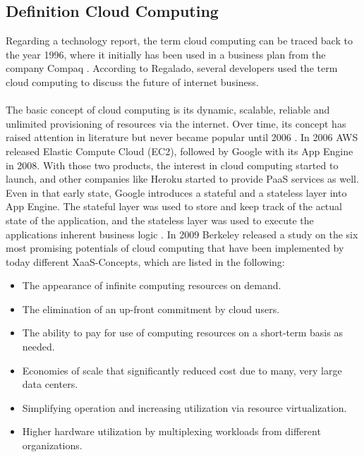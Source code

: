 \documentclass[a4paper,twoside,11pt, pagesize]{scrartcl}
\begin{document}
\begin{spacing}{1.2}
\subsection{Definition Cloud Computing}
Regarding a technology report, the term cloud computing can be traced back to the year 1996, where it initially has been used in a business plan from the company Compaq \cite{regalado2011coined}. According to Regalado, several developers used the term cloud computing to discuss the future of internet business.\\\\ The basic concept of cloud computing is its dynamic, scalable, reliable and unlimited provisioning of resources via the internet. Over time, its concept has raised attention in literature but never became popular until 2006 \cite{fox2009above}. In 2006 AWS released Elastic Compute Cloud (EC2), followed by Google with its App Engine in 2008. With those two products, the interest in cloud computing started to launch, and other companies like Heroku started to provide PaaS services as well. Even in that early state, Google introduces a stateful and a stateless layer into App Engine. The stateful layer was used to store and keep track of the actual state of the application, and the stateless layer was used to execute the applications inherent business logic \cite{fox2009above}. In 2009 Berkeley released a study on the six most promising potentials of cloud computing that have been implemented by today different XaaS-Concepts, which are listed in the following: \\ 
\begin{itemize}
\item[1.] The appearance of infinite computing resources on demand. 
\item[2.] The elimination of an up-front commitment by cloud users.
\item[3.] The ability to pay for use of computing resources on a short-term basis as needed.
\item[4.] Economies of scale that significantly reduced cost due to many, very large data centers.
\item[5.] Simplifying operation and increasing utilization via resource virtualization.
\item[6.] Higher hardware utilization by multiplexing workloads from different organizations.
\end{itemize}

\end{spacing}
\end{document}
